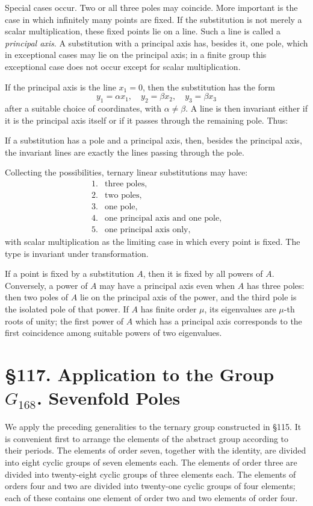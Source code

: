 \documentclass[11pt,a4paper]{book}
\newcommand{\webersection}[2]{\clearpage\section*{\S #1. #2}}
\begin{document}
Special cases occur.  Two or all three poles may coincide.  More important is the case in which infinitely many points are fixed.  If the substitution is not merely a scalar multiplication, these fixed points lie on a line.  Such a line is called a \emph{principal axis}.  A substitution with a principal axis has, besides it, one pole, which in exceptional cases may lie on the principal axis; in a finite group this exceptional case does not occur except for scalar multiplication.

If the principal axis is the line $x_1=0$, then the substitution has the form
\[
 y_1=\alpha x_1,
 \quad
 y_2=\beta x_2,
 \quad
 y_3=\beta x_3
\]
after a suitable choice of coordinates, with $\alpha\ne\beta$.  A line is then invariant either if it is the principal axis itself or if it passes through the remaining pole.  Thus:

If a substitution has a pole and a principal axis, then, besides the principal axis, the invariant lines are exactly the lines passing through the pole.

Collecting the possibilities, ternary linear substitutions may have:
\[
\begin{array}{ll}
1.&\text{three poles},\\
2.&\text{two poles},\\
3.&\text{one pole},\\
4.&\text{one principal axis and one pole},\\
5.&\text{one principal axis only},
\end{array}
\]
with scalar multiplication as the limiting case in which every point is fixed.  The type is invariant under transformation.

If a point is fixed by a substitution $A$, then it is fixed by all powers of $A$.  Conversely, a power of $A$ may have a principal axis even when $A$ has three poles: then two poles of $A$ lie on the principal axis of the power, and the third pole is the isolated pole of that power.  If $A$ has finite order $\mu$, its eigenvalues are $\mu$-th roots of unity; the first power of $A$ which has a principal axis corresponds to the first coincidence among suitable powers of two eigenvalues.


\webersection{117}{Application to the Group \(G_{168}\). Sevenfold Poles}

We apply the preceding generalities to the ternary group constructed in \S 115.  It is convenient first to arrange the elements of the abstract group according to their periods.  The elements of order seven, together with the identity, are divided into eight cyclic groups of seven elements each.  The elements of order three are divided into twenty-eight cyclic groups of three elements each.  The elements of orders four and two are divided into twenty-one cyclic groups of four elements; each of these contains one element of order two and two elements of order four.
\end{document}
